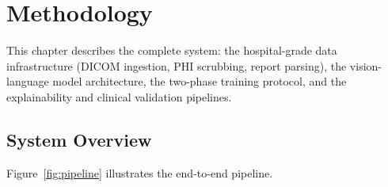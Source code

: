 \chapter{Methodology}
\label{ch:method}

\begin{infobox}
This chapter describes the complete \medxplain{} system: the hospital-grade
data infrastructure (DICOM ingestion, PHI scrubbing, report parsing), the
vision-language model architecture, the two-phase training protocol, and the
explainability and clinical validation pipelines.
\end{infobox}

\section{System Overview}
\label{sec:system_overview}

Figure~\ref{fig:pipeline} illustrates the end-to-end \medxplain{} pipeline.

